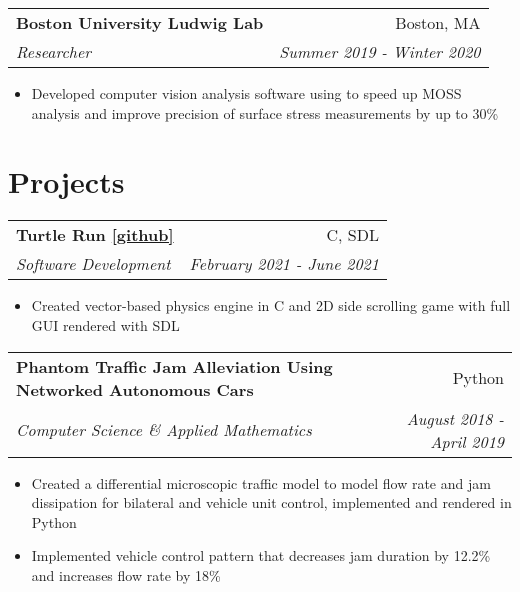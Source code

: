 \documentclass[letterpaper,11pt]{article}
\makeatletter
\newcommand{\resitem}[1]{\item[--] #1 \vspace{-8pt}}
\newcommand{\ressubheading}[4]{
	\vspace{6pt}
	\begin{tabular*}{7.5in}{l@{\extracolsep{\fill}}r}
			\textbf{#1} & #2 \\
			\textit{#3} & \textit{#4}
	\end{tabular*}
	\vspace{-12pt}
}
\makeatother
\begin{document}
	\ressubheading{Boston University Ludwig Lab}{Boston, MA}{Researcher}{Summer 2019 - Winter 2020}
		\begin{itemize}[leftmargin=*]
			\resitem{Developed computer vision analysis software using to speed up MOSS analysis and improve precision of surface stress measurements by up to 30\%}
		\end{itemize}

\section{Projects}

	
		\ressubheading{Turtle Run \href{https://github.com/derekqin8/turtle-run}{[github]}}{C, SDL}{Software Development}{February 2021 - June 2021}
			\begin{itemize}[leftmargin=*]
				\resitem{Created vector-based physics engine in C and 2D side scrolling game with full GUI rendered with SDL}
			\end{itemize}

		\ressubheading{Phantom Traffic Jam Alleviation Using Networked Autonomous Cars}{Python}{Computer Science \& Applied Mathematics}{August 2018 - April 2019}
			\begin{itemize}[leftmargin=*]
				\resitem{Created a differential microscopic traffic model to model flow rate and jam dissipation for bilateral and vehicle unit control, implemented and rendered in Python}
				\resitem{Implemented vehicle control pattern that decreases jam duration by 12.2\% and increases flow rate by 18\%}
			\end{itemize}
	
\end{document}
